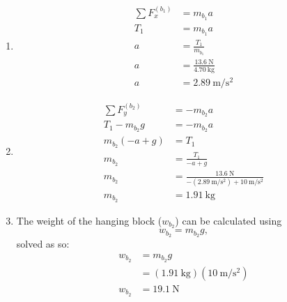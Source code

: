 \documentclass{article}
\begin{document}
\begin{enumerate}[label=\textbf{(\alph*)}]
	\item
		\begin{align*}
			\sum F_x^{(b_1)} & = m_{b_1}a \\
			T_1 & = m_{b_1}a \\
			a & = \frac{T_1}{m_{b_1}} \\
			a & = \frac{\SI{13.6}{\newton}}{\SI{4.70}{\kilogram}} \\
			a & = \SI{2.89}{\meter \per \second \squared}
		\end{align*}
	\item
		\begin{align*}
			\sum F_y^{(b_2)} & = -m_{b_2}a \\
			T_1 - m_{b_2}g & = -m_{b_2}a \\
			m_{b_2} \left( -a + g \right) & = T_1 \\
			m_{b_2} & = \frac{T_1}{-a + g} \\
			m_{b_2} & = \frac{\SI{13.6}{\newton}}{-(\SI{2.89}{\meter \per \second \squared}) + \SI{10}{\meter \per \second \squared}} \\
			m_{b_2} & = \SI{1.91}{\kilogram}
		\end{align*}
	\item
		The weight of the hanging block ($ w_{b_2} $) can be calculated using
		$$ w_{b_2} = m_{b_2}g, $$
		solved as so:
		\begin{align*}
			w_{b_2} & = m_{b_2}g \\
					& = (\SI{1.91}{\kilogram})(\SI{10}{\meter \per \second \squared}) \\
			w_{b_2} & = \SI{19.1}{\newton}
		\end{align*}
\end{enumerate}
\end{document}
